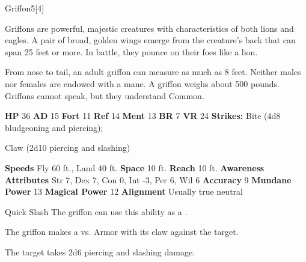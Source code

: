   \begin{monsection}{Griffon}{5}[4]
    \vspace{-1em}\vspace{-1em}
    \vspace{0em}

    
        Griffons are powerful, majestic creatures with characteristics of both lions and eagles.
        A pair of broad, golden wings emerge from the creature’s back that can span 25 feet or more.
        In battle, they pounce on their foes like a lion.
      
        From nose to tail, an adult griffon can measure as much as 8 feet.
        Neither males nor females are endowed with a mane.
        A griffon weighs about 500 pounds.
        Griffons cannot speak, but they understand Common.
      

    \begin{spellcontent}
      \begin{spelltargetinginfo}
        \pari \textbf{HP} 36 \monsep
          \textbf{AD} 15 \monsep
          \textbf{Fort} 11 \monsep
          \textbf{Ref} 14 \monsep
          \textbf{Ment} 13
        \pari \textbf{BR} 7 \monsep
        \textbf{VR} 24
        \pari \textbf{Strikes:}
            Bite  (4d8 bludgeoning and piercing);
\par Claw  (2d10 piercing and slashing)
      \end{spelltargetinginfo}
    \end{spellcontent}
    \begin{monsterfooter}
      \pari \textbf{Speeds} Fly 60 ft., Land 40 ft. \monsep
        \textbf{Space} 10 ft. \monsep
        \textbf{Reach} 10 ft.
      \pari \textbf{Awareness} 
      \pari \textbf{Attributes}
        Str 7, Dex 7,
        Con 0, Int -3,
        Per 6, Wil 6
      \pari \textbf{Accuracy} 9 \monsep
        \textbf{Mundane Power} 13 \monsep
      \textbf{Magical Power} 12
      \pari \textbf{Alignment} Usually true neutral
    \end{monsterfooter}
  \end{monsection}
  \begin{freeability}{Quick Slash}
      The griffon can use this ability as a .\par The griffon makes a 
         vs. Armor
        with its claw against the target.
    
    \hit The target takes 2d6 piercing and slashing damage.
    \end{freeability}
  
